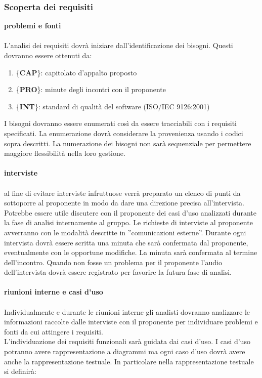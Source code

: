 {{		\subsubsection{Scoperta dei requisiti}{
			\textbf{problemi e fonti}\\\\
			L’analisi dei requisiti dovr\`{a} iniziare dall’identificazione dei bisogni. Questi dovranno essere ottenuti da:
			\begin{enumerate}
				\item \{\textbf{CAP}\}: capitolato d'appalto proposto
				\item \{\textbf{PRO}\}: minute degli incontri con il proponente
				\item \{\textbf{INT}\}: standard di qualit\`{a} del software (ISO/IEC 9126:2001)
			\end{enumerate}
			I bisogni dovranno essere enumerati così da essere tracciabili con i requisiti specificati.
			La enumerazione dovr\`{a} considerare la provenienza usando i codici sopra descritti. La numerazione dei bisogni non sar\`{a} sequenziale per permettere maggiore flessibilit\`{a} nella loro gestione.\\\\
			\textbf{interviste}\\\\
			al fine di evitare interviste infruttuose verr\`{a} preparato un elenco di punti da sottoporre al proponente in modo da dare una direzione precisa all’intervista. Potrebbe essere utile discutere
			con il proponente dei casi d’uso analizzati durante la fase di analisi internamente al gruppo.
			Le richieste di interviste al proponente avverranno con le modalit\`{a} descritte in ”comunicazioni esterne”. Durante ogni intervista dovr\`{a} essere scritta una minuta che sar\`{a} confermata dal proponente, eventualmente con le opportune modifiche. La minuta sar\`{a} confermata al termine dell’incontro. Quando non fosse un problema per il proponente l’audio dell’intervista dovr\`{a} essere registrato per favorire la futura fase di analisi.\\\\
			\textbf{riunioni interne e casi d'uso}\\\\
			Individualmente e durante le riunioni interne gli analisti dovranno analizzare le informazioni raccolte dalle interviste con il proponente per individuare problemi e fonti da cui attingere i requisiti.\\
			L’individuazione dei requisiti funzionali sar\`{a} guidata dai casi d’uso. I casi d’uso potranno avere rappresentazione a diagrammi ma ogni caso d’uso dovr\`{a} avere anche la rappresentazione testuale. In particolare nella rappresentazione testuale si definir\`{a}:
}}}
